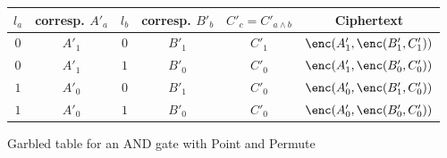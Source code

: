 \begin{figure}[ht]
    \centering
    \begin{minipage}[c][4cm][b]{\linewidth}
        \centering
        \begin{tabular}{cccccc}
            \toprule
            $l_a$ & corresp. $A'_a$ & $l_b$ & corresp. $B'_b$ & $C'_c = C'_{a \land b}$ & Ciphertext\\
            \midrule
            $0$ & $A'_1$ & $0$ & $B'_1$ & $C'_1$ & $\enc(A'_1, \enc(B'_1, C'_1))$\\
            $0$ & $A'_1$ & $1$ & $B'_0$ & $C'_0$ & $\enc(A'_1, \enc(B'_0, C'_0))$\\
            $1$ & $A'_0$ & $0$ & $B'_1$ & $C'_0$ & $\enc(A'_0, \enc(B'_1, C'_0))$\\
            $1$ & $A'_0$ & $1$ & $B'_0$ & $C'_0$ & $\enc(A'_0, \enc(B'_0, C'_0))$\\
            \bottomrule
        \end{tabular}

        \vspace{0.4cm}
    \end{minipage}

    \caption{Garbled table for an AND gate with Point and Permute}
    \label{fig:pnp-garbling}
\end{figure}